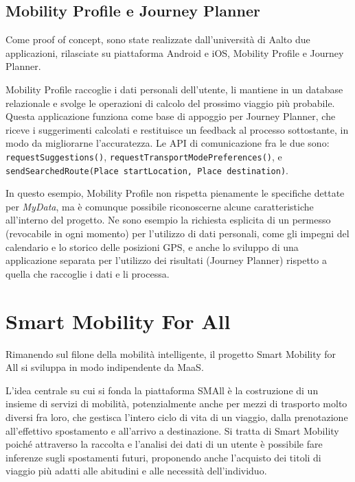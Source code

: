 \subsection{Mobility Profile e Journey Planner}
Come proof of concept, sono state realizzate dall’università di Aalto due applicazioni, rilasciate su piattaforma Android e iOS, Mobility Profile\cite{githubmobilityprofile} e Journey Planner\cite{githubjourneyplanner}.

Mobility Profile raccoglie i dati personali dell’utente, li mantiene in un database relazionale e svolge le operazioni di calcolo del prossimo viaggio pi\`u probabile. Questa applicazione funziona come base di appoggio per Journey Planner, che riceve i suggerimenti calcolati e restituisce un feedback al processo sottostante, in modo da migliorarne l’accuratezza. Le API di comunicazione fra le due sono:
\texttt{requestSuggestions()}, \texttt{requestTransportModePreferences()}, e \texttt{sendSearchedRoute(Place startLocation, Place destination)}.

In questo esempio, Mobility Profile non rispetta pienamente le specifiche dettate per \textit{MyData}, ma \`e comunque possibile riconoscerne alcune caratteristiche all’interno del progetto. Ne sono esempio la richiesta esplicita di un permesso (revocabile in ogni momento) per l’utilizzo di dati personali, come gli impegni del calendario e lo storico delle posizioni GPS, e anche lo sviluppo di una applicazione separata per l’utilizzo dei risultati (Journey Planner) rispetto a quella che raccoglie i dati e li processa.

\section{Smart Mobility For All}
Rimanendo sul filone della mobilità intelligente, il progetto Smart Mobility for All\cite{githubsmall} si sviluppa in modo indipendente da MaaS. 

L’idea centrale su cui si fonda la piattaforma SMAll \`e la costruzione di un insieme di servizi di mobilità, potenzialmente anche per mezzi di trasporto molto diversi fra loro, che gestisca l’intero ciclo di vita di un viaggio, dalla prenotazione all’effettivo spostamento e all’arrivo a destinazione. Si tratta di Smart Mobility poich\'e attraverso la raccolta e l’analisi dei dati di un utente \`e possibile fare inferenze sugli spostamenti futuri, proponendo anche l’acquisto dei titoli di viaggio pi\`u adatti alle abitudini e alle necessità dell’individuo.

